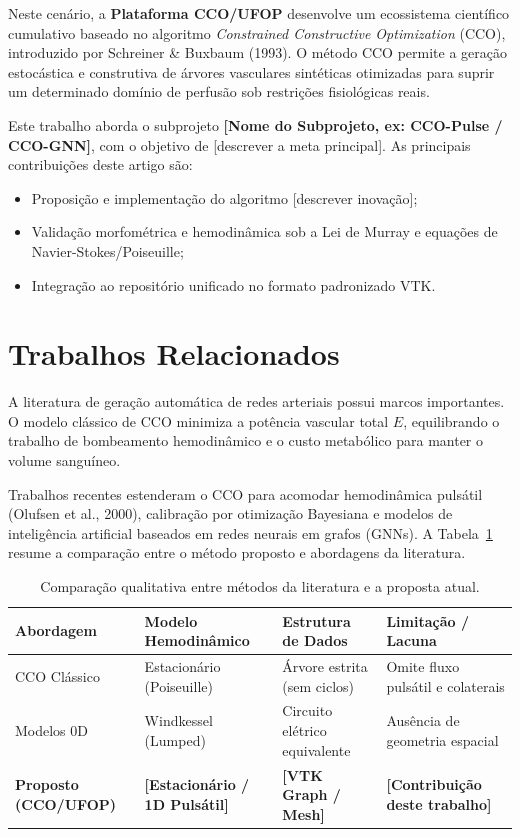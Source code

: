 \documentclass[11pt, a4paper]{article}
\begin{document}
Neste cenário, a \textbf{Plataforma CCO/UFOP} desenvolve um ecossistema científico cumulativo baseado no algoritmo \emph{Constrained Constructive Optimization} (CCO), introduzido por Schreiner \& Buxbaum (1993). O método CCO permite a geração estocástica e construtiva de árvores vasculares sintéticas otimizadas para suprir um determinado domínio de perfusão sob restrições fisiológicas reais.

Este trabalho aborda o subprojeto \textbf{[Nome do Subprojeto, ex: CCO-Pulse / CCO-GNN]}, com o objetivo de [descrever a meta principal]. As principais contribuições deste artigo são:
\begin{itemize}[leftmargin=*]
  \item Proposição e implementação do algoritmo [descrever inovação];
  \item Validação morfométrica e hemodinâmica sob a Lei de Murray e equações de Navier-Stokes/Poiseuille;
  \item Integração ao repositório unificado no formato padronizado VTK.
\end{itemize}

\section{Trabalhos Relacionados}
A literatura de geração automática de redes arteriais possui marcos importantes. O modelo clássico de CCO minimiza a potência vascular total $E$, equilibrando o trabalho de bombeamento hemodinâmico e o custo metabólico para manter o volume sanguíneo.

Trabalhos recentes estenderam o CCO para acomodar hemodinâmica pulsátil (Olufsen et al., 2000), calibração por otimização Bayesiana e modelos de inteligência artificial baseados em redes neurais em grafos (GNNs). A Tabela~\ref{tab:relacionados} resume a comparação entre o método proposto e abordagens da literatura.

\begin{table}[htbp]
  \centering
  \small
  \caption{Comparação qualitativa entre métodos da literatura e a proposta atual.}
  \label{tab:relacionados}
  \begin{tabularx}{\textwidth}{l X X X}
    \toprule
    \textbf{Abordagem} & \textbf{Modelo Hemodinâmico} & \textbf{Estrutura de Dados} & \textbf{Limitação / Lacuna} \\
    \midrule
    CCO Clássico & Estacionário (Poiseuille) & Árvore estrita (sem ciclos) & Omite fluxo pulsátil e colaterais \\
    Modelos 0D & Windkessel (Lumped) & Circuito elétrico equivalente & Ausência de geometria espacial \\
    \textbf{Proposto (CCO/UFOP)} & \textbf{[Estacionário / 1D Pulsátil]} & \textbf{[VTK Graph / Mesh]} & \textbf{[Contribuição deste trabalho]} \\
    \bottomrule
  \end{tabularx}
\end{table}
\end{document}
